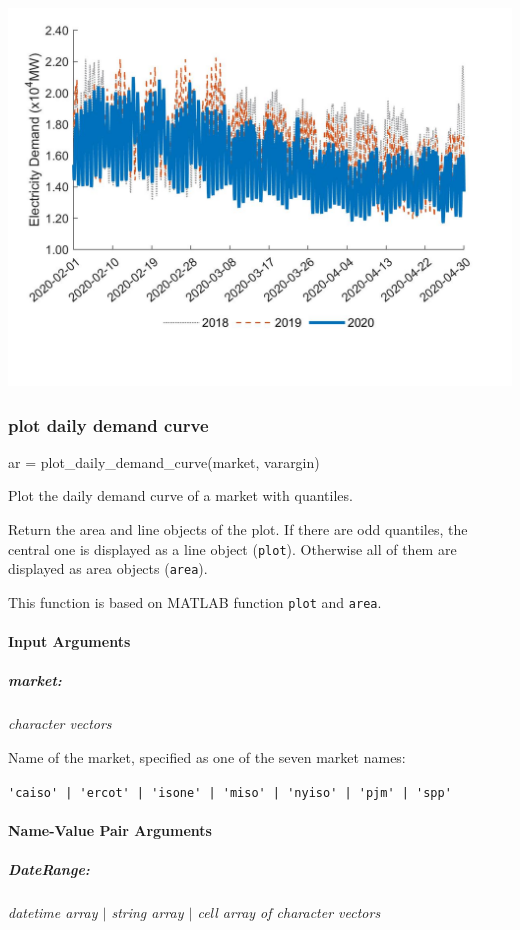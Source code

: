 \documentclass[11pt]{article}
\newcommand{\matlab}{\textsc{MATLAB}}
\numberwithin{equation}{section}
\numberwithin{table}{section}
\numberwithin{figure}{section}
\begin{document}
\begin{center}
  \noindent\includegraphics[width=\textwidth]{figures/plot_demand_example5.jpg}
\end{center}





\subsubsection{plot daily demand curve}
\begin{Code}
  ar = plot_daily_demand_curve(market, varargin)
\end{Code}

Plot the daily demand curve of a market with quantiles.

Return the area and line objects of the plot. If there are odd quantiles, the central one is displayed as a line object (\verb!plot!). Otherwise all of them are displayed as area objects (\verb!area!).

This function is based on \matlab{} function \verb!plot! and \verb!area!.


\paragraph{Input Arguments}
\subparagraph{market:} \textit{character vectors}

Name of the market, specified as one of the seven market names:

\verb!'caiso' | 'ercot' | 'isone' | 'miso' | 'nyiso' | 'pjm' | 'spp'!

\paragraph{Name-Value Pair Arguments}
\subparagraph{DateRange:} \textit{datetime array $|$ string array $|$ cell array of character vectors}
\end{document}
